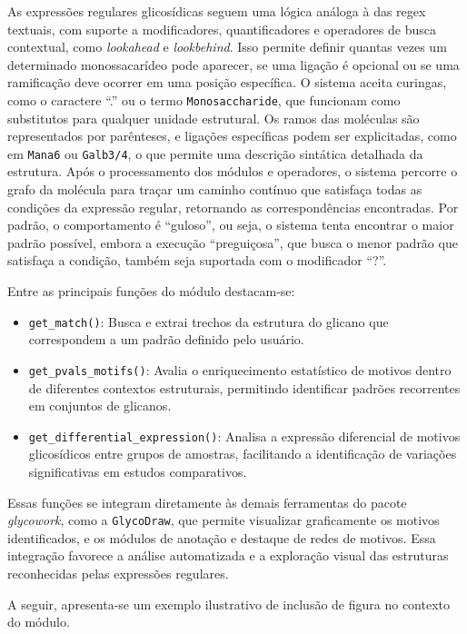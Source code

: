 As expressões regulares glicosídicas seguem uma lógica análoga à das regex textuais, com suporte a modificadores, quantificadores e operadores de busca contextual, como \textit{lookahead} e \textit{lookbehind}. Isso permite definir quantas vezes um determinado monossacarídeo pode aparecer, se uma ligação é opcional ou se uma ramificação deve ocorrer em uma posição específica. O sistema aceita curingas, como o caractere “.” ou o termo \texttt{Monosaccharide}, que funcionam como substitutos para qualquer unidade estrutural. Os ramos das moléculas são representados por parênteses, e ligações específicas podem ser explicitadas, como em \texttt{Mana6} ou \texttt{Galb3/4}, o que permite uma descrição sintática detalhada da estrutura. Após o processamento dos módulos e operadores, o sistema percorre o grafo da molécula para traçar um caminho contínuo que satisfaça todas as condições da expressão regular, retornando as correspondências encontradas. Por padrão, o comportamento é “guloso”, ou seja, o sistema tenta encontrar o maior padrão possível, embora a execução “preguiçosa”, que busca o menor padrão que satisfaça a condição, também seja suportada com o modificador “?”.

Entre as principais funções do módulo destacam-se:
\begin{itemize}
   \item \texttt{get\_match()}: Busca e extrai trechos da estrutura do glicano que correspondem a um padrão definido pelo usuário.
   \item \texttt{get\_pvals\_motifs()}: Avalia o enriquecimento estatístico de motivos dentro de diferentes contextos estruturais, permitindo identificar padrões recorrentes em conjuntos de glicanos.
   \item \texttt{get\_differential\_expression()}: Analisa a expressão diferencial de motivos glicosídicos entre grupos de amostras, facilitando a identificação de variações significativas em estudos comparativos.
\end{itemize}

Essas funções se integram diretamente às demais ferramentas do pacote \textit{glycowork}, como a \texttt{GlycoDraw}, que permite visualizar graficamente os motivos identificados, e os módulos de anotação e destaque de redes de motivos. Essa integração favorece a análise automatizada e a exploração visual das estruturas reconhecidas pelas expressões regulares.

A seguir, apresenta-se um exemplo ilustrativo de inclusão de figura no contexto do módulo.


